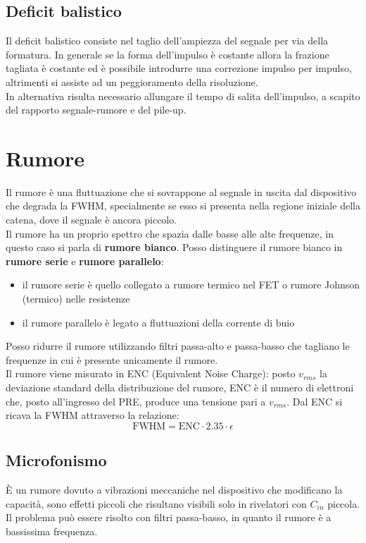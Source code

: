 \subsection{Deficit balistico}
Il deficit balistico consiste nel taglio dell'ampiezza del segnale per via della formatura.
In generale se la forma dell'impulso \`e costante allora la frazione tagliata \`e costante ed \`e possibile introdurre una correzione impulso per impulso,
altrimenti si assiste ad un peggioramento della risoluzione.\\
In alternativa risulta necessario allungare il tempo di salita dell'impulso, a scapito del rapporto segnale-rumore e del pile-up.
\section{Rumore}
Il rumore \`e una fluttuazione che si sovrappone al segnale in uscita dal dispositivo che degrada la FWHM, 
specialmente se esso si presenta nella regione iniziale della catena, dove il segnale \`e ancora piccolo.\\
Il rumore ha un proprio spettro che spazia dalle basse alle alte frequenze, in questo caso si parla di \textbf{rumore bianco}.
Posso distinguere il rumore bianco in \textbf{rumore serie} e \textbf{rumore parallelo}:
\begin{itemize}
\item il rumore serie \`e quello collegato a rumore termico nel FET o rumore Johnson (termico) nelle resistenze 
\item il rumore parallelo \`e legato a fluttuazioni della corrente di buio
\end{itemize}
Posso ridurre il rumore utilizzando filtri passa-alto e passa-basso che tagliano le frequenze in cui \`e presente unicamente il rumore.\\
Il rumore viene misurato in ENC (Equivalent Noise Charge): posto $v_{rms}$ la deviazione standard della distribuzione del rumore, ENC \`e il numero
di elettroni che, posto all'ingresso del PRE, produce una tensione pari a $v_{rms}$.
Dal ENC si ricava la FWHM attraverso la relazione:
\begin{equation*}
\text{FWHM} = \text{ENC} \cdot 2.35 \cdot \epsilon
\end{equation*}
\subsection{Microfonismo}
\`E un rumore dovuto a vibrazioni meccaniche nel dispositivo che modificano la capacit\`a, sono effetti piccoli che risultano visibili
solo in rivelatori con $C_{in}$ piccola. 
Il problema pu\`o essere risolto con filtri passa-basso, in quanto il rumore \`e a bassissima frequenza.

